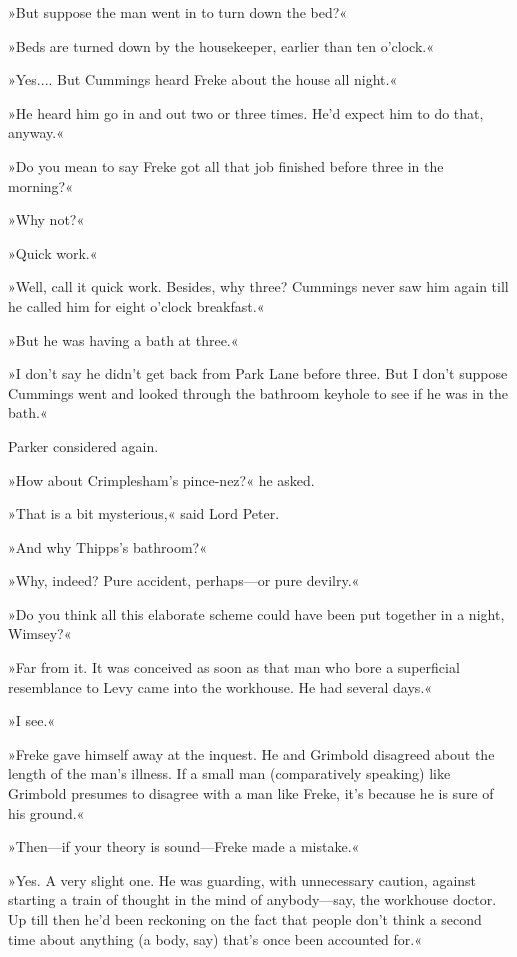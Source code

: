 »But suppose the man went in to turn down the bed?«

»Beds are turned down by the housekeeper, earlier than ten o'clock.«

»Yes.... But Cummings heard Freke about the house all night.«

»He heard him go in and out two or three times. He'd expect him to do that, anyway.«

»Do you mean to say Freke got all that job finished before three in the morning?«

»Why not?«

»Quick work.«

»Well, call it quick work. Besides, why three? Cummings never saw him again till he called him for eight o'clock breakfast.«

»But he was having a bath at three.«

»I don't say he didn't get back from Park Lane before three. But I don't suppose Cummings went and looked through the bathroom keyhole to see if he was in the bath.«

Parker considered again.

»How about Crimplesham's pince-nez?« he asked.

»That is a bit mysterious,« said Lord Peter.

»And why Thipps's bathroom?«

»Why, indeed? Pure accident, perhaps\allowbreak---\allowbreak or pure devilry.«

»Do you think all this elaborate scheme could have been put together in a night, Wimsey?«

»Far from it. It was conceived as soon as that man who bore a superficial resemblance to Levy came into the workhouse. He had several days.«

»I see.«

»Freke gave himself away at the inquest. He and Grimbold disagreed about the length of the man's illness. If a small man (comparatively speaking) like Grimbold presumes to disagree with a man like Freke, it's because he is sure of his ground.«

»Then\allowbreak---\allowbreak if your theory is sound\allowbreak---\allowbreak Freke made a mistake.«

»Yes. A very slight one. He was guarding, with unnecessary caution, against starting a train of thought in the mind of anybody\allowbreak---\allowbreak say, the workhouse doctor. Up till then he'd been reckoning on the fact that people don't think a second time about anything (a body, say) that's once been accounted for.«


